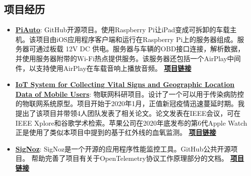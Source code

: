 \documentclass[letterpaper,11pt]{article}
\newcommand{\resumeItem}[2]{
  \item\small{
    \textbf{#1}{: #2 \vspace{-2pt}}
  }
}
\newcommand{\resumeSubItem}[2]{\resumeItem{#1}{#2}\vspace{-4pt}}
\newcommand{\resumeSubHeadingListStart}{\begin{itemize}[leftmargin=*]}
\newcommand{\resumeSubHeadingListEnd}{\end{itemize}}
\begin{document}
\begin{CJK*}{UTF8}{gbsn}
\section{项目经历}
  \resumeSubHeadingListStart
    \resumeSubItem{\href{https://github.com/EthanGeekFan/PiAuto}{PiAuto}}
      {GitHub开源项目。使用Raspberry Pi让iPad变成可拆卸的车载主机。该项目由iOS应用程序客户端和运行在Raspberry Pi上的服务器组成。服务器可通过板载 12V DC 供电。服务器与车辆的OBD接口连接，解析数据，并使用服务器附带的Wi-Fi热点提供服务。该服务器还包括一个AirPlay中间件，以支持使用AirPlay在车载音响上播放音频。 \textbf{\href{https://github.com/EthanGeekFan/PiAuto}{\underline{项目链接}}}}
    \resumeSubItem{\href{https://ieeexplore.ieee.org/abstract/document/9258834?casa\_token=KhERRPM-A1wAAAAA:3B60pPVZ1LtXf1N-xQMXXJcxG8uPbFwKYIEUf4aIxqFbgpwdS7gcBLYsT3EHPH09EOWey6\_Iz7w}{IoT System for Collecting Vital Signs and Geographic Location Data of Mobile Users}}
      {物联网科研项目。设计了一个可以用于传染病防控的物联网系统原型。项目开始于2020年1月，正值新冠疫情迅速蔓延时期。我提出了该项目并带领4人团队发表了相关论文。论文发表在IEEE会议，可在IEEE Xplore和谷歌学术检索。苹果公司在2020年底发布的第6代Apple Watch正是使用了类似本项目中提到的基于红外线的血氧监测。 \textbf{\href{https://ieeexplore.ieee.org/abstract/document/9258834?casa\_token=KhERRPM-A1wAAAAA:3B60pPVZ1LtXf1N-xQMXXJcxG8uPbFwKYIEUf4aIxqFbgpwdS7gcBLYsT3EHPH09EOWey6\_Iz7w}{\underline{项目链接}}}}
    \resumeSubItem{\href{https://signoz.io/}{SigNoz}}
      {SigNoz是一个开源的应用程序性能监控工具。GitHub公共开源项目。 帮助完善了项目有关于OpenTelemetry协议工作原理部分的文档。 \textbf{\href{https://signoz.io/}{\underline{项目链接}}}}
  \resumeSubHeadingListEnd

\end{CJK*}
\end{document}
